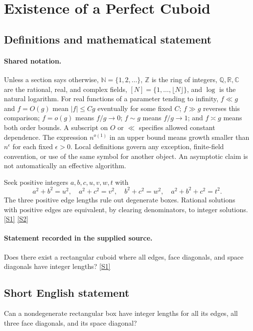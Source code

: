 \documentclass[11pt,a4paper]{article}
\newcommand{\N}{\mathbb{N}}
\newcommand{\Z}{\mathbb{Z}}
\newcommand{\Q}{\mathbb{Q}}
\newcommand{\R}{\mathbb{R}}
\newcommand{\C}{\mathbb{C}}
\newcommand{\sref}[2]{\hyperlink{source:#1:#2}{[S#2]}}
\begin{document}
\section{Existence of a Perfect Cuboid}\label{statement}


\subsection{Definitions and mathematical statement}

\paragraph{Shared notation.}Unless a section says otherwise, $\N=\{1,2,\ldots\}$,
$\Z$ is the ring of integers, $\Q,\R,\C$ are the rational, real, and complex
fields, $[N]=\{1,\ldots,\lfloor N\rfloor\}$, and $\log$ is the natural
logarithm. For real functions of a parameter tending to infinity,
$f\ll g$ and $f=O(g)$ mean $|f|\leq Cg$ eventually for some fixed $C$;
$f\gg g$ reverses this comparison; $f=o(g)$ means $f/g\to0$;
$f\sim g$ means $f/g\to1$; and $f\asymp g$ means both order bounds.
A subscript on $O$ or $\ll$ specifies allowed constant dependence.
The expression $n^{o(1)}$ in an upper bound means growth smaller than
$n^\epsilon$ for each fixed $\epsilon>0$. Local definitions govern any
exception, finite-field convention, or use of the same symbol for another
object. An asymptotic claim is not automatically an effective algorithm.



Seek positive integers $a,b,c,u,v,w,t$ with
\[a^2+b^2=u^2,\quad a^2+c^2=v^2,\quad b^2+c^2=w^2,\quad a^2+b^2+c^2=t^2.\]
The three positive edge lengths rule out degenerate boxes. Rational solutions with positive edges are equivalent, by clearing denominators, to integer solutions. \sref{statement}{1} \sref{statement}{2}

\paragraph{Statement recorded in the supplied source.}
Does there exist a rectangular cuboid where all edges, face diagonals, and space diagonals have integer lengths? \sref{statement}{1}

\subsection{Short English statement}

Can a nondegenerate rectangular box have integer lengths for all its edges, all three face diagonals, and its space diagonal?
\end{document}
